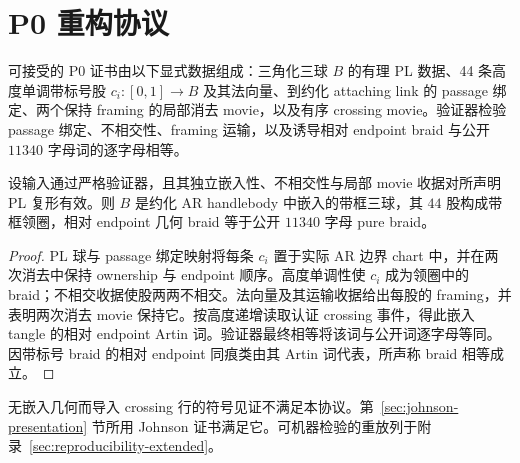 \section{P0 重构协议}\label{app:p0-reconstruction}

可接受的 P0 证书由以下显式数据组成：三角化三球 $B$ 的有理 PL 数据、44 条高度单调带标号股 $c_i:[0,1]\to B$ 及其法向量、到约化 attaching link 的 passage 绑定、两个保持 framing 的局部消去 movie，以及有序 crossing movie。验证器检验 passage 绑定、不相交性、framing 运输，以及诱导相对 endpoint braid 与公开 $11340$ 字母词的逐字母相等。

\begin{lemma}[P0 证书的正确性]
设输入通过严格验证器，且其独立嵌入性、不相交性与局部 movie 收据对所声明 PL 复形有效。则 $B$ 是约化 AR handlebody 中嵌入的带框三球，其 $44$ 股构成带框领圈，相对 endpoint 几何 braid 等于公开 $11340$ 字母 pure braid。
\end{lemma}

\begin{proof}
PL 球与 passage 绑定映射将每条 $c_i$ 置于实际 AR 边界 chart 中，并在两次消去中保持 ownership 与 endpoint 顺序。高度单调性使 $c_i$ 成为领圈中的 braid；不相交收据使股两两不相交。法向量及其运输收据给出每股的 framing，并表明两次消去 movie 保持它。按高度递增读取认证 crossing 事件，得此嵌入 tangle 的相对 endpoint Artin 词。验证器最终相等将该词与公开词逐字母等同。因带标号 braid 的相对 endpoint 同痕类由其 Artin 词代表，所声称 braid 相等成立。
\end{proof}

\begin{remark}
无嵌入几何而导入 crossing 行的符号见证不满足本协议。第~\ref{sec:johnson-presentation} 节所用 Johnson 证书满足它。可机器检验的重放列于附录~\ref{sec:reproducibility-extended}。
\end{remark}
